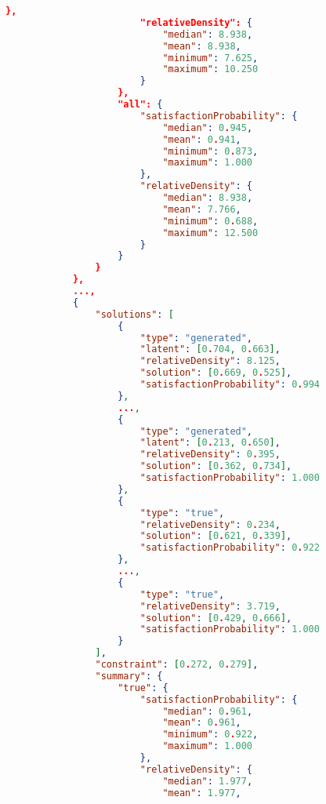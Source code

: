 \documentclass[../main.tex]{subfiles}
\begin{document}
\begin{lstlisting}[language=json,firstnumber=1,caption={The output of a typical experiment, automatically logged when the experiment concludes.},captionpos=b]
                        },
                        "relativeDensity": {  
                            "median": 8.938,
                            "mean": 8.938,
                            "minimum": 7.625,
                            "maximum": 10.250
                        }
                    },
                    "all": {  
                        "satisfactionProbability": {  
                            "median": 0.945,
                            "mean": 0.941,
                            "minimum": 0.873,
                            "maximum": 1.000
                        },
                        "relativeDensity": {  
                            "median": 8.938,
                            "mean": 7.766,
                            "minimum": 0.688,
                            "maximum": 12.500
                        }
                    }
                }
            },
            ...,
            {  
                "solutions": [  
                    {  
                        "type": "generated",
                        "latent": [0.704, 0.663],
                        "relativeDensity": 8.125,
                        "solution": [0.669, 0.525],
                        "satisfactionProbability": 0.994
                    },
                    ...,
                    {  
                        "type": "generated",
                        "latent": [0.213, 0.650],
                        "relativeDensity": 0.395,
                        "solution": [0.362, 0.734],
                        "satisfactionProbability": 1.000
                    },
                    {  
                        "type": "true",
                        "relativeDensity": 0.234,
                        "solution": [0.621, 0.339],
                        "satisfactionProbability": 0.922
                    },
                    ...,
                    {  
                        "type": "true",
                        "relativeDensity": 3.719,
                        "solution": [0.429, 0.666],
                        "satisfactionProbability": 1.000
                    }
                ],
                "constraint": [0.272, 0.279],
                "summary": {  
                    "true": {  
                        "satisfactionProbability": {  
                            "median": 0.961,
                            "mean": 0.961,
                            "minimum": 0.922,
                            "maximum": 1.000
                        },
                        "relativeDensity": {  
                            "median": 1.977,
                            "mean": 1.977,

\end{lstlisting}
\end{document}
